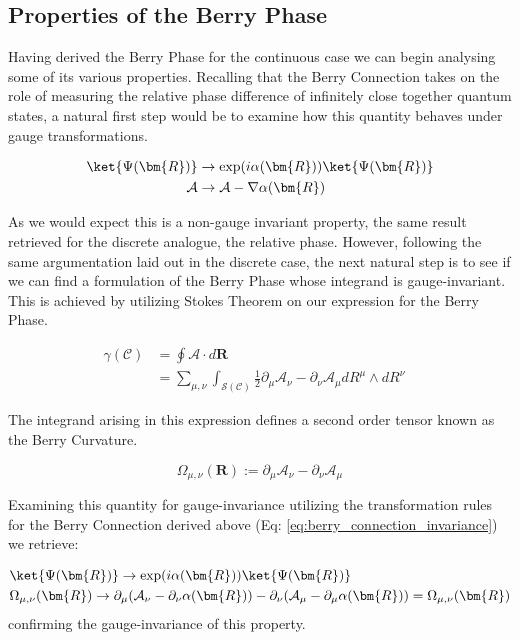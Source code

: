\documentclass{article}
\begin{document}
\subsection{Properties of the Berry Phase\label{ssec:BP_Properties}}

Having derived the Berry Phase for the continuous case we can begin analysing some of its various properties. Recalling that the Berry Connection takes on the role of measuring the relative phase difference of infinitely close together quantum states, a natural first step would be to examine how this quantity behaves under gauge transformations.

  \begin{align}\label{eq:berry_connection_invariance}
    \nonumber \ket{\Psi(\bm{R})} &\rightarrow \exp(i \alpha(\bm{R})) \ket{\Psi(\bm{R})}\\
    \mathcal{A} &\rightarrow \mathcal{A} - \nabla \alpha(\bm{R})
  \end{align}

  As we would expect this is a non-gauge invariant property, the same result retrieved for the discrete analogue, the relative phase. However, following the same argumentation laid out in the discrete case, the next natural step is to see if we can find a formulation of the Berry Phase whose integrand is gauge-invariant. This is achieved by utilizing Stokes Theorem on our expression for the Berry Phase.

  \begin{align*}
    \gamma(\mathcal{C}) &= \oint \mathcal{A} \cdot d\bm{R}\\
    & = \sum_{\mu, \nu} \int_{\mathcal{S}(\mathcal{C})} \frac{1}{2} \partial_{\mu} \mathcal{A}_{\nu} - \partial_{\nu} \mathcal{A}_{\mu} dR^{\mu} \wedge dR^{\nu}&
  \end{align*}


The integrand arising in this expression defines a second order tensor known as the Berry Curvature.

  \begin{equation*}
    \Omega_{\mu, \nu}(\bm{R}) := \partial_{\mu} \mathcal{A}_{\nu} - \partial_{\nu} \mathcal{A}_{\mu}  
  \end{equation*}

Examining this quantity for gauge-invariance utilizing the transformation rules for the Berry Connection derived above (Eq: \ref{eq:berry_connection_invariance}) we retrieve:

       \begin{align*}
         &\ket{\Psi(\bm{R})} \rightarrow \exp(i\alpha(\bm{R}))\ket{\Psi(\bm{R})}\\
         &\Omega_{\mu, \nu}(\bm{R}) \rightarrow \partial_{\mu} (\mathcal{A}_{\nu}
         - \partial_{\nu} \alpha(\bm{R})) - \partial_{\nu}(\mathcal{A}_{\mu} -
         \partial_{\mu} \alpha(\bm{R})) = \Omega_{\mu, \nu}(\bm{R})
      \end{align*}
confirming the gauge-invariance of this property.
\end{document}
